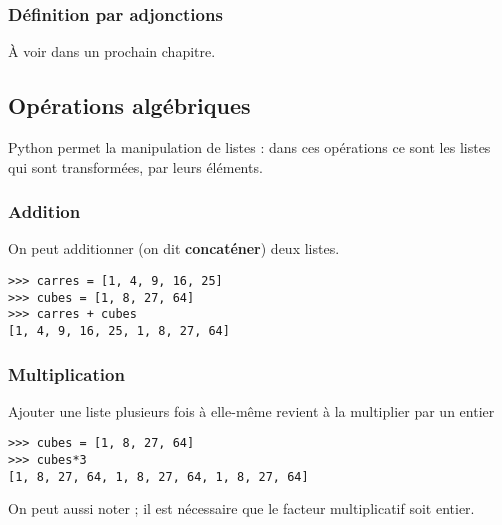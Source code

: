 \subsubsection{Définition par adjonctions}
À voir dans un prochain chapitre.
\subsection{Opérations algébriques}
Python permet la manipulation de listes : dans ces opérations ce sont les listes qui sont transformées, par leurs éléments.
\subsubsection{Addition}
On peut additionner (on dit {\bf concaténer}) deux listes.
\begin{lstlisting}
>>> carres = [1, 4, 9, 16, 25]
>>> cubes = [1, 8, 27, 64]
>>> carres + cubes
[1, 4, 9, 16, 25, 1, 8, 27, 64]
\end{lstlisting}
\subsubsection{Multiplication}
Ajouter une liste plusieurs fois à elle-même revient à la multiplier par un entier
\begin{lstlisting}
>>> cubes = [1, 8, 27, 64]
>>> cubes*3 
[1, 8, 27, 64, 1, 8, 27, 64, 1, 8, 27, 64]
\end{lstlisting}
On peut aussi noter  ; il est nécessaire que le facteur multiplicatif soit entier.
